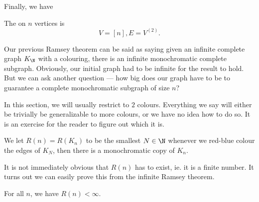 \documentclass[a4paper]{article}
\begin{document}
Finally, we have
\begin{eg}
  The   on $n$ vertices is
  \[
    V = [n], E = V^{(2)}.
  \]
  \begin{center}
  \end{center}
\end{eg}
Our previous Ramsey theorem can be said as saying given an infinite complete graph $K_\N$ with a colouring, there is an infinite monochromatic complete subgraph. Obviously, our initial graph had to be infinite for the result to hold. But we can ask another question --- how big does our graph have to be to guarantee a complete monochromatic subgraph of size $n$?

In this section, we will usually restrict to $2$ colours. Everything we say will either be trivially be generalizable to more colours, or we have no idea how to do so. It is an exercise for the reader to figure out which it is.
\begin{defi}
  We let $R(n) = R(K_n)$ to be the smallest $N \in \N$ whenever we red-blue colour the edges of $K_N$, then there is a monochromatic copy of $K_n$.
\end{defi}

It is not immediately obvious that $R(n)$ has to exist, ie. it is a finite number. It turns out we can easily prove this from the infinite Ramsey theorem.
\begin{thm}
  For all $n$, we have $R(n) < \infty$.
\end{thm}
\end{document}
